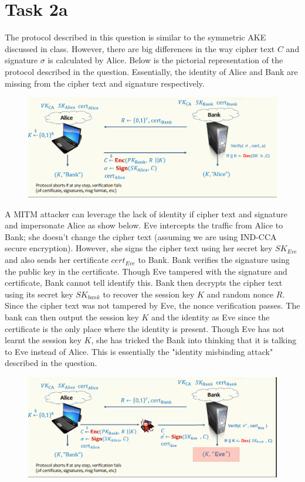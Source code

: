 \documentclass{article}
\begin{document}
    \section*{Task 2a}
    The protocol described in this question is similar to the symmetric AKE discussed in class. However, there are big differences in the way cipher text $C$ and signature $\sigma$ is calculated by Alice. Below is the pictorial representation of the protocol described in the question. Essentially, the identity of Alice and Bank are missing from the cipher text and signature respectively.

    \begin{figure}[H]
        \includegraphics[width=1\textwidth]{protocol2.png}
    \end{figure}

    A MITM attacker can leverage the lack of identity if cipher text and signature and impersonate Alice as show below. Eve intercepts the traffic from Alice to Bank; she doesn't change the cipher text (assuming we are using IND-CCA secure encryption). However, she signs the cipher text using her secret key $SK_{Eve}$ and also sends her certificate $cert_{Eve}$ to Bank. Bank verifies the signature using the public key in the certificate. Though Eve tampered with the signature and certificate, Bank cannot tell identify this. Bank then decrypts the cipher text using its secret key $SK_{bank}$ to recover the session key $K$ and random nonce $R$. Since the cipher text was not tampered by Eve, the nonce verification passes. The bank can then output the session key $K$ and the identity as Eve since the certificate is the only place where the identity is present. Though Eve has not learnt the session key $K$, she has tricked the Bank into thinking that it is talking to Eve instead of Alice. This is essentially the "identity misbinding attack" described in the question.

    \begin{figure}[H]
        \includegraphics[width=1\textwidth]{mitmAttack2.png}
    \end{figure}
\end{document}
